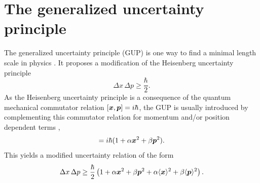 \documentclass[12pt,a4paper]{report}
\numberwithin{equation}{chapter}
\begin{document}
%

\section{The generalized uncertainty principle}
The generalized uncertainty principle (GUP) is one way to find a minimal length scale in physics \cite{Adler2001,Casadio:2013tza}. It proposes a modification of the Heisenberg uncertainty principle
\begin{equation}
\Delta x \, \Delta p \geq \frac{\hbar}{2}.
\end{equation}
As the Heisenberg uncertainty principle is a consequence of the quantum mechanical commutator relation $[\boldsymbol{ x }, \boldsymbol{ p }] = i\hbar$, the GUP is usually introduced by complementing this commutator relation for momentum and/or position dependent terms \cite{Kempf1994},
%
\begin{equation}
[\bv x, \bv p] = i\hbar (1 + \alpha \bv x^2 + \beta \bv p^2).
\end{equation}
This yields a modified uncertainty relation of the form
\begin{equation}\label{eq:GUP-relation-generic}
\Delta x \, \Delta p \geq \frac{\hbar}{2}
\left( 1 + \alpha \boldsymbol{ x }^2 + \beta \boldsymbol{ p }^2 + \alpha \langle \boldsymbol{ x }\rangle^2 + \beta \langle \boldsymbol{ p } \rangle^2 \right).
\end{equation}
\end{document}
